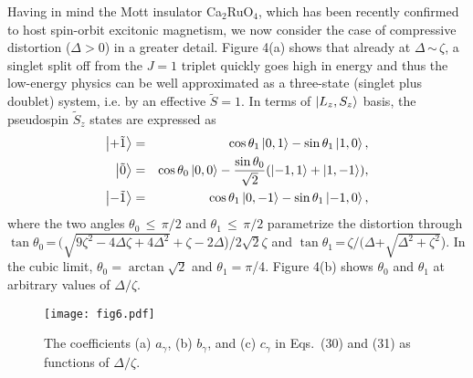 \documentclass[twocolumn,prb,aps,showpacs,superscriptaddress]{revtex4-1}
\begin{document}
Having in mind the Mott insulator Ca$_2$RuO$_4$, which has been recently 
confirmed\cite{Jai17,Sou17} to host spin-orbit excitonic 
magnetism\cite{Khaliullin13}, we now consider the case of compressive 
distortion ($\Delta>0$) in a greater detail. Figure 4(a) shows that already 
at $\Delta$\,$\sim$\,$\zeta$, a singlet split off from the $J=1$ triplet 
quickly goes high in energy and thus the low-energy physics can be well 
approximated as a three-state (singlet plus doublet) system, i.e. by an 
effective $\tilde{S}=1$\cite{Jai17,Sou17}. In terms of $\ket{L_z,S_z}$ basis, 
the pseudospin $\tilde{S}_z$ states are expressed as 
\begin{eqnarray}
 \ket{+\tilde{1}}&=&\cos{\theta_1}\ket{0,1}-\sin{\theta_1}\ket{1,0}, \\
 \ket{\tilde{0}}&=&\cos{\theta_0}\ket{0,0}- 
\frac{\sin{\theta_0}}{\sqrt{2}} (\ket{-1,1}+\ket{1,-1}), \\ 
 \ket{-\tilde{1}}&=&\cos{\theta_1}\ket{0,-1}-\sin{\theta_1}\ket{-1,0},
\end{eqnarray}
where the two angles $\theta_0$\,$\leq$\,$\pi/2$ and
$\theta_1$\,$\leq$\,$\pi/2$ parametrize the distortion through
$\tan\theta_0$\,=\,$(\sqrt{9\zeta^2-4\Delta\zeta+4\Delta^2}+
\zeta-2\Delta$)/$2\sqrt{2}\zeta$
and $\tan\theta_1$\,=\,$\zeta/(\Delta$+$\sqrt{\Delta^2+\zeta^2}$). In the
cubic limit, $\theta_0=\arctan{\sqrt{2}}$ and $\theta_1=\pi$/4. Figure 4(b) 
shows $\theta_0$ and $\theta_1$ at arbitrary values of $\Delta/\zeta$. 

\begin{figure}[b]
\centerline{\texttt{[image: fig6.pdf]}}
\caption{The coefficients (a) $a_\gamma$, (b) $b_\gamma$, and (c) $c_\gamma$ 
         in Eqs.~(30) and (31) as functions of $\Delta/\zeta$.} 
\end{figure}
\end{document}
